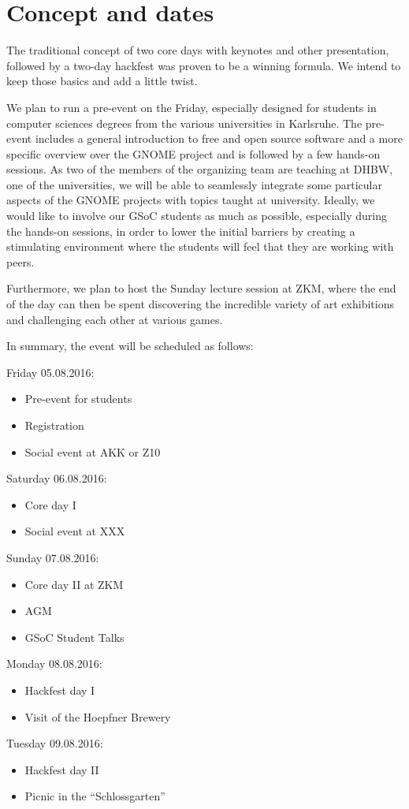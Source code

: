 
\section{Concept and dates}

The traditional concept of two core days with keynotes and other presentation, followed by a two-day hackfest was proven to be a winning formula. We intend to keep those basics and add a little twist. 

We plan to run a pre-event on the Friday, especially designed for students in computer sciences degrees from the various universities in Karlsruhe. The pre-event includes a general introduction to free and open source software and a more specific overview over the GNOME project and is followed by a few hands-on sessions. As two of the members of the organizing team are teaching at DHBW, one of the universities, we will be able to seamlessly integrate some particular aspects of the GNOME projects with topics taught at university. Ideally, we would like to involve our GSoC students as much as possible, especially during the hands-on sessions, in order to lower the initial barriers by creating a stimulating environment where the students will feel that they are working with peers. 

Furthermore, we plan to host the Sunday lecture session at ZKM, where the end of the day can then be spent discovering the incredible variety of art exhibitions and challenging each other at various games.

In summary, the event will be scheduled as follows:

Friday 05.08.2016:
\begin{itemize}
\item Pre-event for students
\item Registration
\item Social event at AKK or Z10
\end{itemize}

Saturday 06.08.2016:
\begin{itemize}
\item  Core day I
\item  Social event at XXX
\end{itemize}

Sunday 07.08.2016:
\begin{itemize}
\item  Core day II at ZKM
\item  AGM
\item  GSoC Student Talks
\end{itemize}

Monday 08.08.2016:
\begin{itemize}
\item  Hackfest day I
\item  Visit of the Hoepfner Brewery
\end{itemize}

Tuesday 09.08.2016:
\begin{itemize}
\item  Hackfest day II
\item  Picnic in the “Schlossgarten”
\end{itemize}

